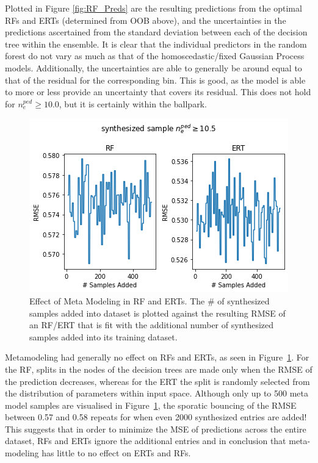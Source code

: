\documentclass[a4paper, twoside, final, 12pt]{article}
\begin{document}
{Plotted in Figure \ref{fig:RF_Preds} are the resulting predictions from the optimal RFs and ERTs (determined from OOB above), and the uncertainties in the predictions ascertained from the standard deviation between each of the decision tree within the ensemble.
It is clear that the individual predictors in the random forest do not vary as much as that of the homoscedastic/fixed Gaussian Process models. 
Additionally, the uncertainties are able to generally be around equal to that of the residual for the corresponding bin. This is good, as the model is able to more or less provide an uncertainty that covers its residual. This does not hold for $n_e^{ped} \geq 10.0$, but it is certainly within the ballpark. 

\begin{figure}
		\centering
		\vspace{-20pt}
		\includegraphics[width=\linewidth, keepaspectratio=true, trim=0 0 0 30, clip]{./src/ERT_vs_RF_meta_modeling}
		\vspace{-22pt}
		\caption{Effect of Meta Modeling in RF and ERTs. The \# of synthesized samples added into dataset is plotted against the resulting RMSE of an RF/ERT that is fit with the additional number of synthesized samples added into its training dataset.}
		\label{fig:RF_meta_model}
\end{figure}
Metamodeling had generally no effect on RFs and ERTs, as seen in Figure~\ref{fig:RF_meta_model}.
For the RF, splits in the nodes of the decision trees are made only when the RMSE of the prediction decreases, whereas for the ERT the split is randomly selected from the distribution of parameters within input space.
Although only up to 500 meta model samples are visualised in Figure~\ref{fig:RF_meta_model}, the sporatic bouncing of the RMSE between 0.57 and 0.58 repeats for when even 2000 synthesized entries are added!
This suggests that in order to minimize the MSE of predictions across the entire dataset, RFs and ERTs ignore the additional entries and in  conclusion that meta-modeling has little to no effect on ERTs and RFs.

}
\end{document}

